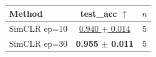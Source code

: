 \begin{tabular}{lcc}
\toprule
Method & test\_acc $\uparrow$ & $n$ \\
\midrule
SimCLR ep=10 & \underline{0.940 $\pm$ 0.014} & 5 \\
SimCLR ep=30 & \textbf{0.955 $\pm$ 0.011} & 5 \\
\bottomrule
\end{tabular}
